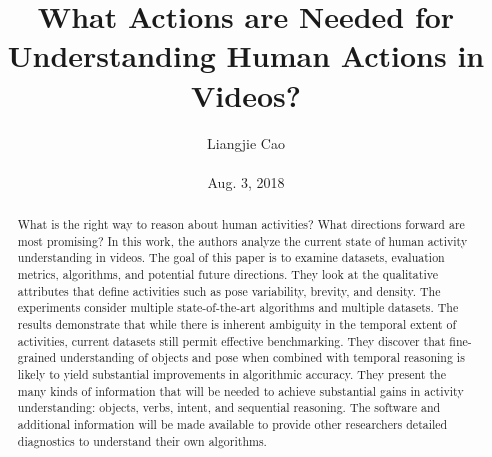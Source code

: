 \documentclass[10pt,twocolumn,letterpaper]{article}
\begin{document}
\title{\textbf{What Actions are Needed for Understanding Human Actions in Videos?}}
\author{Liangjie Cao\\\\ Aug. 3, 2018}
\maketitle
\begin{abstract}
What is the right way to reason about human activities? What directions forward are most promising? In this work, the authors analyze the current state of human activity understanding in videos. The goal of this paper is to examine datasets, evaluation metrics, algorithms, and potential future directions. They look at the qualitative attributes that define activities such as pose variability, brevity, and density. The experiments consider multiple state-of-the-art algorithms and multiple datasets. The results demonstrate that while there is inherent ambiguity in the temporal extent of activities, current datasets still permit effective benchmarking.
They discover that fine-grained understanding of objects and pose when combined with temporal reasoning is likely to yield substantial improvements in algorithmic accuracy. They present the many kinds of information that will be needed to achieve substantial gains in activity understanding: objects, verbs, intent, and sequential reasoning. The software and additional information will be made available to provide other researchers detailed diagnostics to understand their own algorithms.
\end{abstract}
\end{document}
